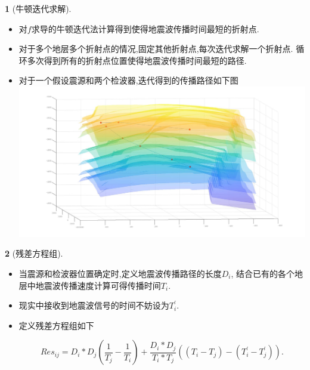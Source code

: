 \documentclass[UTF8]{ctexbeamer}	%
\theoremstyle{plain}
\theoremstyle{definition}
\newtheorem{emt}{}[section]
\theoremstyle{remark}
\numberwithin{equation}{section}
\begin{document}
\begin{frame}
  \begin{emt}[牛顿迭代求解]
      \begin{itemize}
          \item 
          对$f$求导的牛顿迭代法计算得到使得地震波传播时间最短的折射点.

          \item 对于多个地层多个折射点的情况,固定其他折射点,每次迭代求解一个折射点.
          循环多次得到所有的折射点位置使得地震波传播时间最短的路径.

          \item 对于一个假设震源和两个检波器,迭代得到的传播路径如下图
          \includegraphics[width = .6\textwidth]{fig/s2p4.jpg}
      \end{itemize}
  \end{emt}
\end{frame}

\begin{frame}
\begin{emt}[残差方程组]
    \begin{itemize}
        \item 当震源和检波器位置确定时,定义地震波传播路径的长度$D_i$,
        结合已有的各个地层中地震波传播速度计算可得传播时间$T_i$.
        \item 现实中接收到地震波信号的时间不妨设为$T_i^\prime$.
        \item 定义残差方程组如下
        \begin{small}
            \begin{equation}
                Res_{ij} = D_i * D_j(\frac{1}{T_j} - \frac{1}{T_i}) + \frac{D_i * D_j}{T_i * T_j}((T_i - T_j) 
                 - (T_i^\prime - T_j^\prime)).
            \end{equation}
        \end{small}
    \end{itemize}
\end{emt}
\end{frame}
\end{document}
